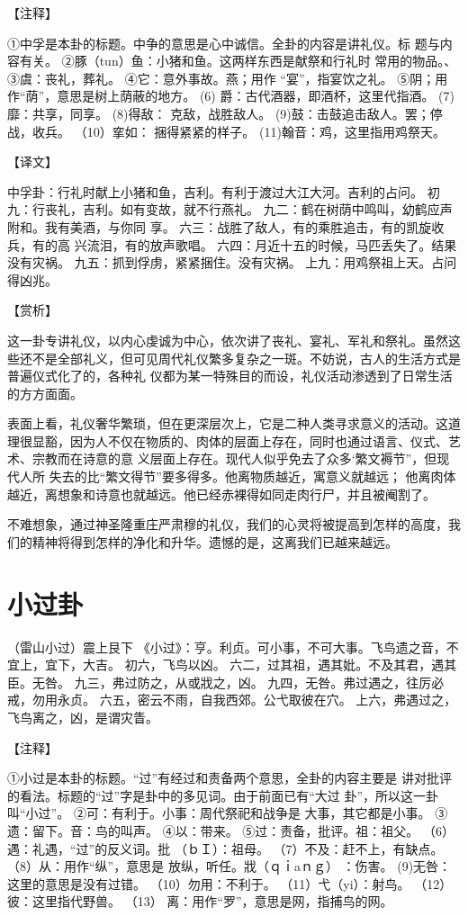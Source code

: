 \documentclass[a4paper,12pt,UTF8,twoside]{ctexbook}
\begin{document}
【注释】

①中孚是本卦的标题。中争的意思是心中诚信。全卦的内容是讲礼仪。标 题与内容有关。
②豚（tun）鱼：小猪和鱼。这两样东西是献祭和行礼时 常用的物品。、
③虞：丧礼，葬礼。
④它：意外事故。燕；用作 “宴”，指宴饮之礼。
⑤阴；用作“荫”，意思是树上荫蔽的地方。
(6) 爵：古代酒器，即酒杯，这里代指酒。
(7)靡：共享，同享。
(8)得敌： 克敌，战胜敌人。
(9)鼓：击鼓追击敌人。罢；停战，收兵。
（10）挛如： 捆得紧紧的样子。
(11)翰音：鸡，这里指用鸡祭天。

【译文】

中孚卦：行礼时献上小猪和鱼，吉利。有利于渡过大江大河。吉利的占问。
初九：行丧礼，吉利。如有变故，就不行燕礼。
九二：鹤在树荫中鸣叫，幼鹤应声附和。我有美酒，与你同 享。
六三：战胜了敌人，有的乘胜追击，有的凯旋收兵，有的高 兴流泪，有的放声歌唱。
六四：月近十五的时候，马匹丢失了。结果没有灾祸。
九五：抓到俘虏，紧紧捆住。没有灾祸。
上九：用鸡祭祖上天。占问得凶兆。

【赏析】

这一卦专讲礼仪，以内心虔诚为中心，依次讲了丧礼、宴礼、军礼和祭礼。虽然这些还不是全部礼义，但可见周代礼仪繁多复杂之一斑。不妨说，古人的生活方式是普遍仪式化了的，各种礼 仪都为某一特殊目的而设，礼仪活动渗透到了日常生活的方方面面。

表面上看，礼仪奢华繁琐，但在更深层次上，它是二种人类寻求意义的活动。这道理很显豁，因为人不仅在物质的、肉体的层面上存在，同时也通过语言、仪式、艺术、宗教而在诗意的意 义层面上存在。现代人似乎免去了众多‘繁文褥节”，但现代人所 失去的比“繁文得节”要多得多。他离物质越近，寓意义就越远； 他离肉体越近，离想象和诗意也就越远。他已经赤裸得如同走肉行尸，并且被阉割了。

不难想象，通过神圣隆重庄严肃穆的礼仪，我们的心灵将被提高到怎样的高度，我们的精神将得到怎样的净化和升华。遗憾的是，这离我们已越来越远。

\chapter{小过卦}

（雷山小过）震上艮下
《小过》：亨。利贞。可小事，不可大事。飞鸟遗之音，不宜上，宜下，大吉。
初六，飞鸟以凶。
六二，过其祖，遇其妣。不及其君，遇其臣。无咎。
九三，弗过防之，从或戕之，凶。
九四，无咎。弗过遇之，往厉必戒，勿用永贞。
六五，密云不雨，自我西郊。公弋取彼在穴。
上六，弗遇过之，飞鸟离之，凶，是谓灾眚。

【注释】

①小过是本卦的标题。“过”有经过和责备两个意思，全卦的内容主要是 讲对批评的看法。标题的“过”字是卦中的多见词。由于前面已有“大过 卦”，所以这一卦叫“小过”。
②可：有利于。小事：周代祭祀和战争是 大事，其它都是小事。
③遗：留下。音：鸟的叫声。
④以：带来。
⑤过：责备，批评。祖：祖父。
（6）遇：礼遇，“过”的反义词。批 （ｂＩ）：祖母。
（7）不及：赶不上，有缺点。
（8）从：用作“纵”，意思是 放纵，听任。戕（ｑｉaｎｇ） ：伤害。
(9)无咎：这里的意思是没有过错。
（10）勿用：不利于。
（11）弋（yi）：射鸟。
（12）彼：这里指代野兽。
（13） 离：用作“罗”，意思是网，指捕鸟的网。
\end{document}
